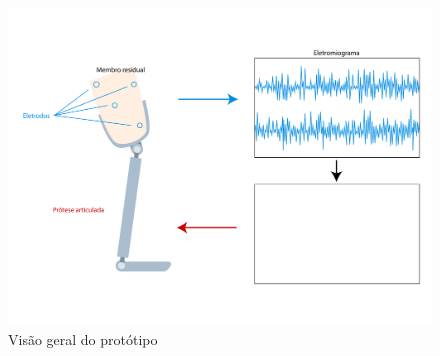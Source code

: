 \begin{figure}[htb]
	\caption{\label{fig:bigpicture}Visão geral do protótipo}
	\begin{center}
	    \includegraphics[width=1\textwidth]{resources/big_picture}
	\end{center}
\end{figure}